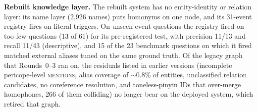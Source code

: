 \textbf{Rebuilt knowledge layer.} The rebuilt system has no
entity-identity or relation layer: its name layer (2{,}926 names) puts
homonyms on one node, and its 31-event registry fires on literal
triggers. On unseen event questions the registry fired on too few
questions (13 of 61) for its pre-registered test, with precision 11/13
and recall 11/43 (descriptive), and 15 of the 23 benchmark questions on
which it fired matched external aliases tuned on the same ground truth.
Of the legacy graph that Rounds~0--3 ran on, the residuals listed in
earlier versions (incomplete pericope-level \textsc{mentions}, alias
coverage of $\sim$0.8\% of entities, unclassified relation candidates,
no coreference resolution, and toneless-pinyin IDs that over-merge
homophones, 266 of them colliding) no longer bear on the deployed
system, which retired that graph.

